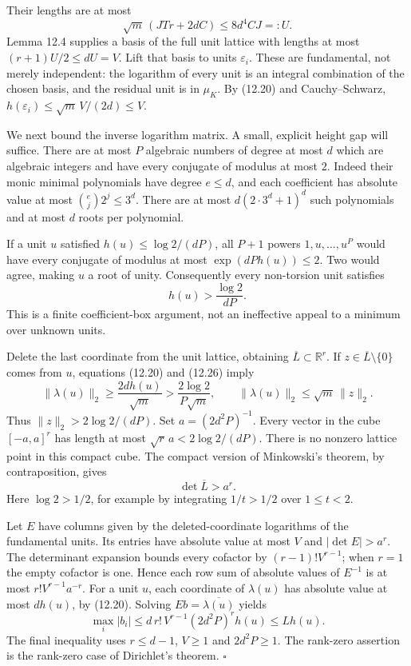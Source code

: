 \documentclass[
  11pt,
  a4paper,
]{article}
\begin{document}
Their lengths are at most \[
\sqrt m\,(JTr+2dC)\le 8d^4CJ=:U.
\tag{12.25}
\] Lemma 12.4 supplies a basis of the full unit lattice with lengths at
most \((r+1)U/2\le dU=V\). Lift that basis to units \(\varepsilon_i\).
These are fundamental, not merely independent: the logarithm of every
unit is an integral combination of the chosen basis, and the residual
unit is in \(\mu_K\). By (12.20) and Cauchy--Schwarz,
\(h(\varepsilon_i)\le\sqrt m\,V/(2d)\le V\).

We next bound the inverse logarithm matrix. A small, explicit height gap
will suffice. There are at most \(P\) algebraic numbers of degree at
most \(d\) which are algebraic integers and have every conjugate of
modulus at most \(2\). Indeed their monic minimal polynomials have
degree \(e\le d\), and each coefficient has absolute value at most
\(\binom e j2^j\le3^d\). There are at most \(d(2\cdot3^d+1)^d\) such
polynomials and at most \(d\) roots per polynomial.

If a unit \(u\) satisfied \(h(u)\le\log2/(dP)\), all \(P+1\) powers
\(1,u,\ldots,u^P\) would have every conjugate of modulus at most
\(\exp(dP h(u))\le2\). Two would agree, making \(u\) a root of unity.
Consequently every non-torsion unit satisfies \[
h(u)>\frac{\log2}{dP}.
\tag{12.26}
\] This is a finite coefficient-box argument, not an ineffective appeal
to a minimum over unknown units.

Delete the last coordinate from the unit lattice, obtaining
\(\overline L\subset\mathbb R^r\). If \(z\in\overline L\setminus\{0\}\)
comes from \(u\), equations (12.20) and (12.26) imply \[
\|\lambda(u)\|_2\ge \frac{2dh(u)}{\sqrt m}>
 \frac{2\log2}{P\sqrt m},\qquad
\|\lambda(u)\|_2\le\sqrt m\,\|z\|_2.
\] Thus \(\|z\|_2>2\log2/(dP)\). Set \(a=(2d^2P)^{-1}\). Every vector in
the cube \([-a,a]^r\) has length at most \(\sqrt r\,a<2\log2/(dP)\).
There is no nonzero lattice point in this compact cube. The compact
version of Minkowski's theorem, by contraposition, gives \[
\det\overline L>a^r.
\tag{12.27}
\] Here \(\log2>1/2\), for example by integrating \(1/t>1/2\) over
\(1\le t<2\).

Let \(E\) have columns given by the deleted-coordinate logarithms of the
fundamental units. Its entries have absolute value at most \(V\) and
\(|\det E|>a^r\). The determinant expansion bounds every cofactor by
\((r-1)!V^{r-1}\); when \(r=1\) the empty cofactor is one. Hence each
row sum of absolute values of \(E^{-1}\) is at most \(r!V^{r-1}a^{-r}\).
For a unit \(u\), each coordinate of \(\lambda(u)\) has absolute value
at most \(dh(u)\), by (12.20). Solving \(Eb=\overline{\lambda(u)}\)
yields \[
\max_i|b_i|
\le d\,r!\,V^{r-1}(2d^2P)^r h(u)\le Lh(u).
\tag{12.28}
\] The final inequality uses \(r\le d-1\), \(V\ge1\) and \(2d^2P\ge1\).
The rank-zero assertion is the rank-zero case of Dirichlet's theorem.
\(\square\)
\end{document}
